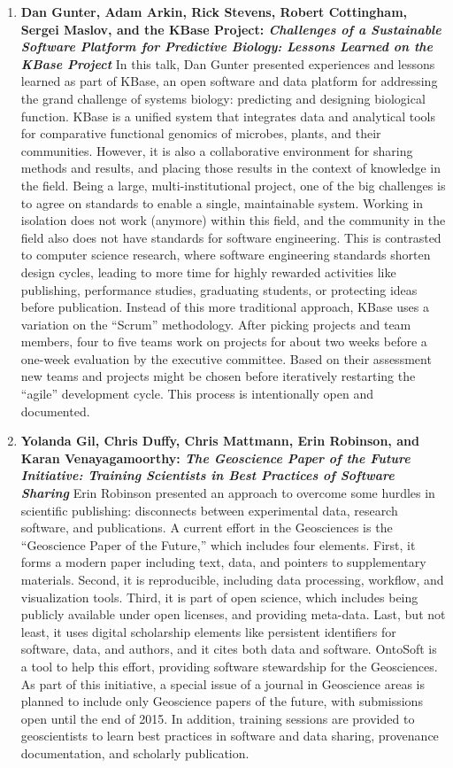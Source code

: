 \documentclass[11pt, oneside]{amsart}
\begin{document}
\begin{enumerate}
\item \textbf{Dan Gunter, Adam Arkin, Rick Stevens, Robert Cottingham,
Sergei Maslov, and the KBase Project: \textit{Challenges of a Sustainable Software Platform for
Predictive Biology: Lessons Learned on the KBase Project}} In this talk, Dan
Gunter presented experiences and lessons learned as part of KBase, an open
software and data platform for addressing the grand challenge of systems
biology: predicting and designing biological function. KBase is a unified system
that integrates data and analytical tools for comparative functional genomics of
microbes, plants, and their communities. However, it is also a collaborative
environment for sharing methods and results, and placing those results in the
context of knowledge in the field. Being a large, multi-institutional project,
one of the big challenges is to agree on standards to enable a single,
maintainable system. Working in isolation does not work (anymore) within this
field, and the community in the field also does not have standards for software
engineering. This is contrasted to computer science research, where software
engineering standards shorten design cycles, leading to more time for highly rewarded
activities like publishing, performance studies, graduating students, or
protecting ideas before publication. Instead of this more
traditional approach, KBase uses a variation on the ``Scrum'' methodology.
After picking projects and team members, four to five teams work on projects for about two
weeks before a one-week evaluation by the executive committee. Based on their assessment new
teams and projects might be chosen before iteratively restarting the ``agile'' development cycle.
This process is intentionally open and documented.

\item \textbf{Yolanda Gil, Chris Duffy, Chris Mattmann, Erin Robinson, and Karan
Venayagamoorthy: \textit{The Geoscience Paper of the Future Initiative: Training
Scientists in Best Practices of Software Sharing}} Erin Robinson presented an
approach to overcome some hurdles in scientific publishing: disconnects between
experimental data, research software, and publications. A current effort in the
Geosciences is the ``Geoscience Paper of the Future,'' which includes four
elements. First, it forms a modern paper including text, data, and pointers to
supplementary materials. Second, it is reproducible, including data processing,
workflow, and visualization tools. Third, it is part of open science, which
includes being publicly available under open licenses, and providing meta-data.
Last, but not least, it uses digital scholarship elements like persistent
identifiers for software, data, and authors, and it cites both data and
software. OntoSoft is a tool to help this effort, providing software stewardship
for the Geosciences. As part of this initiative, a special issue of a journal in
Geoscience areas is planned to include only Geoscience papers of the future,
with submissions open until the end of 2015. In addition, training sessions are
provided to geoscientists to learn best practices in software and data sharing,
provenance documentation, and scholarly publication.


\end{enumerate}
\end{document}
